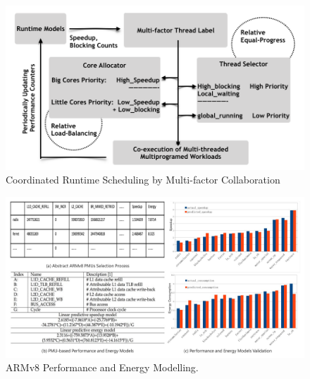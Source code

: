 
\begin{figure}
\centering
\includegraphics[scale=0.5]{figures/COLAB_M.pdf}
\caption{Coordinated Runtime Scheduling by Multi-factor Collaboration}
\label{figure:f2}
\end{figure} 

\begin{figure}
\centering
\includegraphics[scale=0.25]{figures/arm_model.pdf}
\caption{ARMv8 Performance and Energy Modelling. }
\label{arm_model}
\end{figure}
